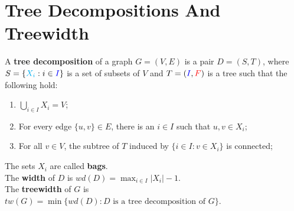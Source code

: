 \section{Tree Decompositions And Treewidth}
\begin{definition}\label{8.1}
    A \textbf{tree decomposition} of a graph $G=(V,E)$ is a pair $D=(S,T)$, where $S=\{{\color{cyan}{X_i}}:i\in {\color{blue}{I}}\}$ is a set of subsets of $V$ and $T=({\color{blue}I},{\color{red}F})$ is a tree such that the following hold:
    \begin{enumerate}
        \item $\bigcup_{i\in I}X_i=V$;
        \item For every edge $\{u,v\}\in E$, there is an $i\in I$ such that $u,v\in X_i$;
        \item For all $v\in V$, the subtree of $T$ induced by $\{i\in I:v\in X_i\}$ is connected;
    \end{enumerate}
The sets $X_i$ are called \textbf{bags}.\\
The \textbf{width} of  $D$ is $wd(D)=\max_{i\in I}|X_i|-1$.\\
The \textbf{treewidth} of $G$ is $tw(G)=\min\{wd(D):D\text{ is a tree decomposition of }G\}$. 

 \begin{center}
\end{center}
\end{definition}
